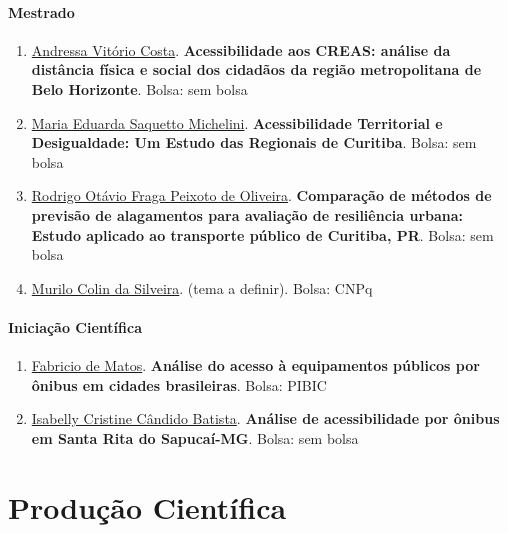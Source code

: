 \documentclass[
  brazilian,
  11pt,
  a4paper,
]{article}
\begin{document}
\paragraph{Mestrado}\label{mestrado}

\begin{enumerate}
\def\labelenumi{\arabic{enumi}.}
\item
  \href{http://lattes.cnpq.br/7862988333397510}{Andressa Vitório Costa}.
  \textbf{Acessibilidade aos CREAS: análise da distância física e social
  dos cidadãos da região metropolitana de Belo Horizonte}. Bolsa: sem
  bolsa
\item
  \href{http://lattes.cnpq.br/6355612958124418}{Maria Eduarda Saquetto
  Michelini}. \textbf{Acessibilidade Territorial e Desigualdade: Um
  Estudo das Regionais de Curitiba}. Bolsa: sem bolsa
\item
  \href{http://lattes.cnpq.br/3660336154224847}{Rodrigo Otávio Fraga
  Peixoto de Oliveira}. \textbf{Comparação de métodos de previsão de
  alagamentos para avaliação de resiliência urbana: Estudo aplicado ao
  transporte público de Curitiba, PR}. Bolsa: sem bolsa
\item
  \href{https://lattes.cnpq.br/2158424254735233}{Murilo Colin da
  Silveira}. (tema a definir). Bolsa: CNPq
\end{enumerate}

\paragraph{Iniciação Científica}\label{iniciauxe7uxe3o-cientuxedfica}

\begin{enumerate}
\def\labelenumi{\arabic{enumi}.}
\item
  \href{https://lattes.cnpq.br/1401504528774648}{Fabricio de Matos}.
  \textbf{Análise do acesso à equipamentos públicos por ônibus em
  cidades brasileiras}. Bolsa: PIBIC
\item
  \href{\%5Bhttps://lattes.cnpq.br/1401504528774648\%5D(http://lattes.cnpq.br/4242646632967599)}{Isabelly
  Cristine Cândido Batista}. \textbf{Análise de acessibilidade por
  ônibus em Santa Rita do Sapucaí-MG}. Bolsa: sem bolsa
\end{enumerate}

\section{Produção Científica}\label{produuxe7uxe3o-cientuxedfica}
\end{document}
